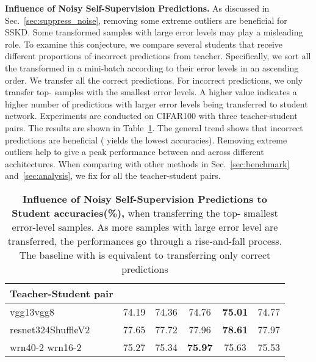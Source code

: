 \documentclass[runningheads]{llncs}
\begin{document}
\noindent
{\bf Influence of Noisy Self-Supervision Predictions.}
As discussed in Sec.~\ref{sec:suppress_noise}, removing some extreme outliers are beneficial for SSKD. Some transformed samples with large error levels may play a misleading role. To examine this conjecture, we compare several students that receive different proportions of incorrect predictions from teacher. 
Specifically, we sort all the transformed  in a mini-batch according to their error levels in an ascending order. We transfer all the correct predictions. For incorrect predictions, we only transfer top- samples with the smallest error levels. A higher  value indicates a higher number of predictions with larger error levels being transferred to student network.
Experiments are conducted on CIFAR100 with three teacher-student pairs. The results are shown in Table~\ref{tab:error_level}. 
The general trend shows that incorrect predictions are beneficial ( yields the lowest accuracies). Removing extreme outliers help to give a peak performance between  and  across different acchitectures. 
When comparing with other methods in Sec.~\ref{sec:benchmark} and~\ref{sec:analysis}, we fix  for all the teacher-student pairs.

\begin{table}[t]
    \centering
    \caption{\textbf{Influence of Noisy Self-Supervision Predictions to Student accuracies(\%),} when transferring the top- smallest error-level samples. As more samples with large error level are transferred, the performances go through a rise-and-fall process. The baseline with  is equivalent to transferring only correct predictions}
    \vspace{-5pt}
    \begin{tabular}{l|ccccc}
    \toprule
    Teacher-Student pair &  &  &  &  &  \\
    \midrule
    vgg13vgg8 & 74.19 & 74.36 & 74.76 & \textbf{75.01} & 74.77 \\
    resnet324ShuffleV2 & 77.65 & 77.72 & 77.96 & \textbf{78.61} & 77.97 \\
    wrn40-2 wrn16-2 & 75.27 & 75.34 & \textbf{75.97} & 75.63 & 75.53 \\
    \bottomrule
    \end{tabular}
    \label{tab:error_level}
\end{table}
\end{document}
